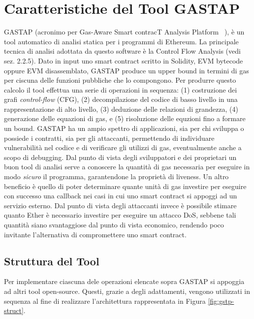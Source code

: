 \section{Caratteristiche del Tool GASTAP}

GASTAP (acronimo per Gas-Aware Smart contracT Analysis Platform ~\cite{DBLP:journals/corr/abs-1811-10403}), è un tool automatico di analisi statica per i programmi di Ethereum. La principale tecnica di analisi adottata da questo software è la Control Flow Analysis (vedi sez. 2.2.5).\newline
\indent Dato in input uno smart contract scritto in Solidity, EVM bytecode oppure EVM disassemblato, GASTAP produce un upper bound in termini di gas per ciscuna delle funzioni pubbliche che lo compongono. Per produrre questo calcolo il tool effettua una serie di operazioni in sequenza: (1) costruzione dei grafi \textit{control-flow} (CFG), (2) decompilazione del codice di basso livello in una rappresentazione di alto livello, (3) deduzione delle relazioni di grandezza, (4) generazione delle equazioni di gas, e (5) risoluzione delle equzioni fino a formare un bound.\newline
\indent GASTAP ha un ampio spettro di applicazioni, sia per chi sviluppa o possiede i contratti, sia per gli attaccanti, permettendo di individuare vulnerabilità nel codice e di verificare gli utilizzi di gas, eventualmente anche a scopo di debugging.
Dal punto di vista degli sviluppatori e dei proprietari un buon tool di analisi serve a conoscere la quantità di gas necessaria per eseguire in modo \textit{sicuro} il programma, garantendone la proprietà di liveness. Un altro beneficio è quello di poter determinare quante unità di gas investire per eseguire con successo una callback nei casi in cui uno smart contract si appoggi ad un servizio esterno.
Dal punto di vista degli attaccanti invece è possibile stimare quanto Ether è necessario investire per eseguire un attacco DoS, sebbene tali quantità siano svantaggiose dal punto di vista economico, rendendo poco invitante l'alternativa di compromettere uno smart contract.\newline

    \subsection{Struttura del Tool}
    
    Per implementare ciascuna dele operazioni elencate sopra GASTAP si appoggia ad altri tool open-source. Questi, grazie a degli adattamenti, vengono utilizzati in sequenza al fine di realizzare l'architettura rappresentata in Figura \ref{fig:gstp-struct}.\newline 
    
